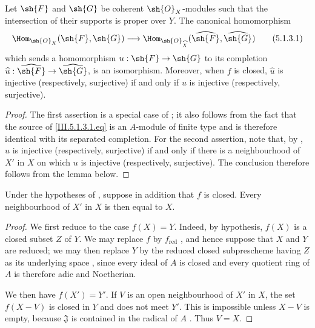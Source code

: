 \begin{corollary}[5.1.3]
\label{III.5.1.3}
Let $\sh{F}$ and $\sh{G}$ be coherent $\sh{O}_X$-modules such that
the intersection of their supports is proper over $Y$.  The
canonical homomorphism
\[
  \Hom_{\sh{O}_X}(\sh{F},\sh{G})
  \longrightarrow
  \Hom_{\sh{O}_{\widehat{X}}}
  (\widehat{\sh{F}},\widehat{\sh{G}})
  \tag{5.1.3.1}
  \label{III.5.1.3.1.eq}
\]
which sends a homomorphism $u:\sh{F}\to\sh{G}$ to its completion
$\widehat{u}:\widehat{\sh{F}}\to\widehat{\sh{G}}$, is an
isomorphism.  Moreover, when $f$ is closed,
$\widehat{u}$ is injective (respectively, surjective) if and only
if $u$ is injective (respectively, surjective).
\end{corollary}

\begin{proof}
The first assertion is a special case of ; it also
follows from the fact that the source of \eqref{III.5.1.3.1.eq} is
an $A$-module of finite type and is therefore identical with its
separated completion.  For the second assertion, note that, by
, $\widehat{u}$ is injective (respectively,
surjective) if and only if there is a neighbourhood of $X'$ in
$X$ on which $u$ is injective (respectively, surjective).  The
conclusion therefore follows from the lemma below.
\end{proof}


\begin{lemma}[5.1.3.1]
\label{III.5.1.3.1}
Under the hypotheses of , suppose in addition that
$f$ is closed.  Every neighbourhood of $X'$ in $X$ is then equal
to $X$.
\end{lemma}

\begin{proof}
We first reduce to the case $f(X)=Y$.  Indeed, by hypothesis,
$f(X)$ is a closed subset $Z$ of $Y$.  We may replace $f$ by
$f_{\mathrm{red}}$ , and hence suppose that $X$
and $Y$ are reduced; we may then replace $Y$ by the reduced closed
subprescheme having $Z$ as its underlying space
, since every ideal of $A$ is closed and every
quotient ring of $A$ is therefore adic and Noetherian.

We then have $f(X')=Y'$.  If $V$ is an open neighbourhood of $X'$
in $X$, the set $f(X-V)$ is closed in $Y$ and does not meet $Y'$.
This is impossible unless $X-V$ is empty, because $\mathfrak{J}$
is contained in the radical of $A$
 .  Thus $V=X$.
\end{proof}

